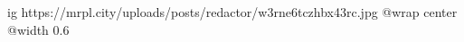  
 
 
 
 

\ifcmt
  ig https://mrpl.city/uploads/posts/redactor/w3rne6tczhbx43rc.jpg
  @wrap center
  @width 0.6
\fi
